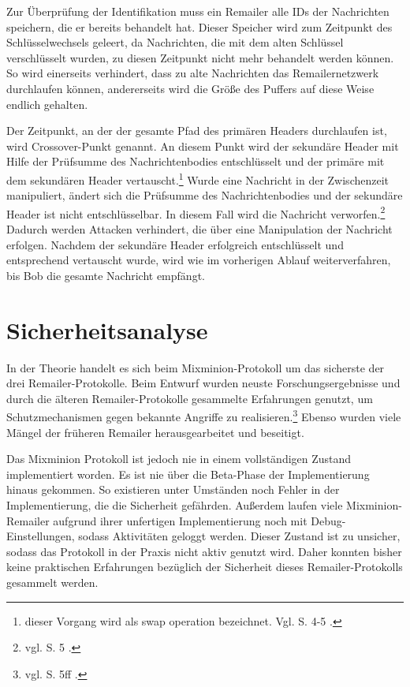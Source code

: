 Zur Überprüfung der Identifikation muss ein Remailer alle IDs der Nachrichten speichern, die er bereits behandelt hat. Dieser Speicher wird zum Zeitpunkt des Schlüsselwechsels geleert, da Nachrichten, die mit dem alten Schlüssel verschlüsselt wurden, zu diesen Zeitpunkt nicht mehr behandelt werden können. So wird einerseits verhindert, dass zu alte Nachrichten das Remailernetzwerk durchlaufen können, andererseits wird die Größe des Puffers auf diese Weise endlich gehalten.

Der Zeitpunkt, an der der gesamte Pfad des primären Headers durchlaufen ist, wird \glqq Crossover\grqq -Punkt genannt. An diesem Punkt wird der sekundäre Header mit Hilfe der Prüfsumme des Nachrichtenbodies entschlüsselt und der primäre mit dem sekundären Header vertauscht.\footnote{dieser Vorgang wird als swap operation bezeichnet. Vgl. S. 4-5 \cite{mixminion}.} Wurde eine Nachricht in der Zwischenzeit manipuliert, ändert sich die Prüfsumme des Nachrichtenbodies und der sekundäre Header ist nicht entschlüsselbar. In diesem Fall wird die Nachricht verworfen.\footnote{vgl. S. 5 \cite{mixminion}.} Dadurch werden Attacken verhindert, die über eine Manipulation der Nachricht erfolgen. Nachdem der sekundäre Header erfolgreich entschlüsselt und entsprechend vertauscht wurde, wird wie im vorherigen Ablauf weiterverfahren, bis Bob die gesamte Nachricht empfängt. 

\section{Sicherheitsanalyse}
In der Theorie handelt es sich beim Mixminion-Protokoll um das sicherste der drei Remailer-Protokolle. Beim Entwurf wurden neuste Forschungsergebnisse und durch die älteren Remailer-Protokolle gesammelte Erfahrungen genutzt, um Schutzmechanismen gegen bekannte Angriffe zu realisieren.\footnote{vgl. S. 5ff \cite{mixminion}.} Ebenso wurden viele Mängel der früheren Remailer herausgearbeitet und beseitigt. 

Das Mixminion Protokoll ist jedoch nie in einem vollständigen Zustand implementiert worden. Es ist nie über die Beta-Phase der Implementierung hinaus gekommen. So existieren unter Umständen noch Fehler in der Implementierung, die die Sicherheit gefährden. Außerdem laufen viele Mixminion-Remailer aufgrund ihrer unfertigen Implementierung noch mit Debug-Einstellungen, sodass Aktivitäten geloggt werden. Dieser Zustand ist zu unsicher, sodass das Protokoll in der Praxis nicht aktiv genutzt wird. Daher konnten bisher keine praktischen Erfahrungen bezüglich der Sicherheit dieses Remailer-Protokolls gesammelt werden.


